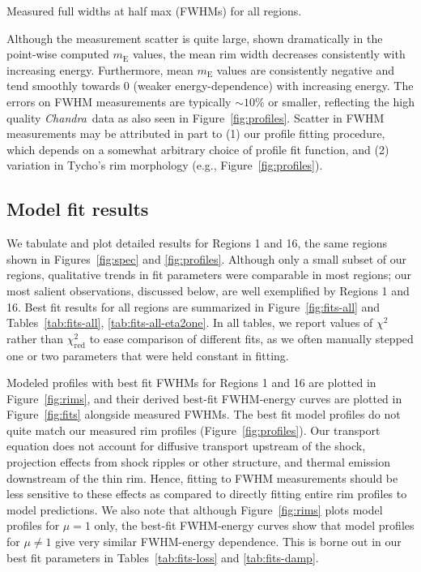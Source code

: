 \documentclass[manuscript]{aastex}  %
\newcommand*{\mt}{\mathrm}
\newcommand*{\abt}{\mathord{\sim}} %
\newcommand*{\Chandra}{\textit{Chandra}\ }
\newcommand*{\mE}{m_\mt{E}}
\begin{document}
\begin{table*}
    \iftoggle{manuscript}{
        \tiny
    }{
        \scriptsize
    }
    \centering
    \caption{Measured full widths at half max (FWHMs) for all regions.
             \label{tab:fwhms}}
    
\end{table*}

Although the measurement scatter is quite large, shown dramatically in the
point-wise computed $\mE$ values, the mean rim width decreases consistently
with increasing energy.  Furthermore, mean $\mE$ values are consistently
negative and tend smoothly towards $0$ (weaker energy-dependence) with
increasing energy.  The errors on FWHM measurements are typically $\abt 10\%$
or smaller, reflecting the high quality \Chandra data as also seen in
Figure~\ref{fig:profiles}.  Scatter in FWHM measurements may be attributed in
part to (1) our profile fitting procedure, which depends on a somewhat
arbitrary choice of profile fit function, and (2) variation in Tycho's rim
morphology (e.g., Figure~\ref{fig:profiles}).

\subsection{Model fit results}
\label{sec:fit-results}

We tabulate and plot detailed results for Regions 1 and 16, the same regions
shown in Figures~\ref{fig:spec} and \ref{fig:profiles}.  Although only a small
subset of our regions, qualitative trends in fit parameters were comparable in
most regions; our most salient observations, discussed below, are well
exemplified by Regions 1 and 16.  Best fit results for all regions are
summarized in Figure~\ref{fig:fits-all} and Tables~\ref{tab:fits-all},
\ref{tab:fits-all-eta2one}.  In all tables, we report values of $\chi^2$ rather
than $\chi^2_\mt{red}$ to ease comparison of different fits, as we often
manually stepped one or two parameters that were held constant in fitting.

Modeled profiles with best fit FWHMs for Regions 1 and 16 are plotted in
Figure~\ref{fig:rims}, and their derived best-fit FWHM-energy curves
are plotted in Figure~\ref{fig:fits} alongside measured FWHMs.
The best fit model profiles do not quite match our measured rim profiles
(Figure~\ref{fig:profiles}).  Our transport equation does not account for
diffusive transport upstream of the shock, projection effects from shock
ripples or other structure, and thermal emission downstream of the thin rim.
Hence, fitting to FWHM measurements should be less sensitive to these effects
as compared to directly fitting entire rim profiles to model predictions.
We also note that although Figure~\ref{fig:rims} plots model profiles for
$\mu = 1$ only, the best-fit FWHM-energy curves show that model profiles for
$\mu \neq 1$ give very similar FWHM-energy dependence.  This is borne out in
our best fit parameters in Tables~\ref{tab:fits-loss} and \ref{tab:fits-damp}.
\end{document}
